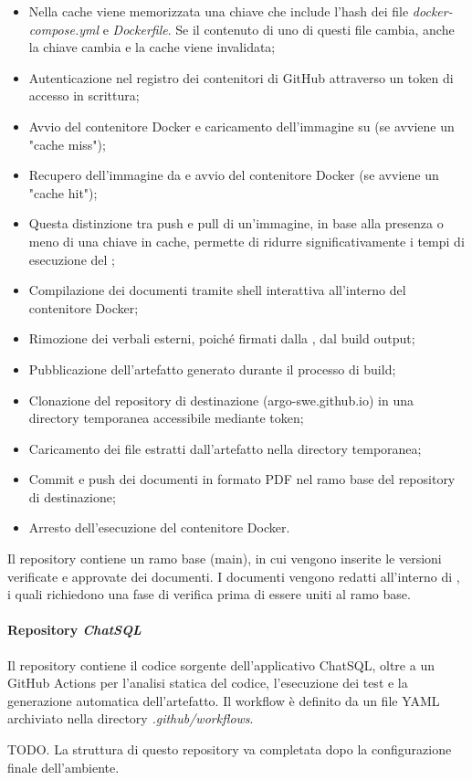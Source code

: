 \begin{itemize}
\begin{itemize}
    \item Nella cache viene memorizzata una chiave che include l'hash dei file \emph{docker-compose.yml} e \emph{Dockerfile}. Se il contenuto di uno di questi file cambia, anche la chiave cambia e la cache viene invalidata;
    \item Autenticazione nel registro dei contenitori di GitHub attraverso un token di accesso in scrittura;
    \item Avvio del contenitore Docker e caricamento dell'immagine su  (se avviene un "cache miss");
    \item Recupero dell'immagine da  e avvio del contenitore Docker (se avviene un "cache hit");
    \item Questa distinzione tra push e pull di un'immagine, in base alla presenza o meno di una chiave in cache, permette di ridurre significativamente i tempi di esecuzione del ;
    \item Compilazione dei documenti tramite shell interattiva all'interno del contenitore Docker;
    \item Rimozione dei verbali esterni, poiché firmati dalla , dal build output;
    \item Pubblicazione dell'artefatto generato durante il processo di build;
    \item Clonazione del repository di destinazione (argo-swe.github.io) in una directory temporanea accessibile mediante token;
    \item Caricamento dei file estratti dall'artefatto nella directory temporanea;
    \item Commit e push dei documenti in formato PDF nel ramo base del repository di destinazione;
    \item Arresto dell'esecuzione del contenitore Docker.
  \end{itemize}
\end{itemize}  
Il repository contiene un ramo base (main), in cui vengono inserite le versioni verificate e approvate dei documenti. I documenti vengono redatti all'interno di , i quali richiedono una fase di verifica prima di essere uniti al ramo base.

\paragraph{Repository \emph{ChatSQL}}
Il repository contiene il codice sorgente dell'applicativo ChatSQL, oltre a un  GitHub Actions per l'analisi statica del codice, l'esecuzione dei test e la generazione automatica dell'artefatto. Il workflow è definito da un file YAML archiviato nella directory \emph{.github/workflows}.

\par TODO. La struttura di questo repository va completata dopo la configurazione finale dell'ambiente.